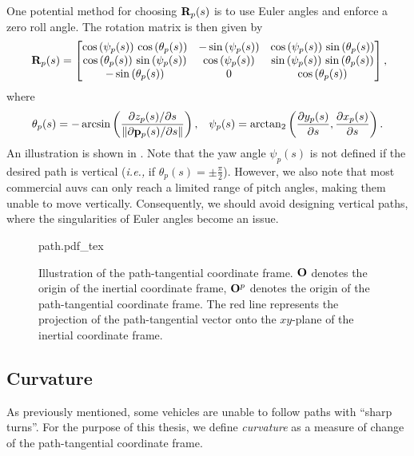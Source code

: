 One potential method for choosing $\mathbf{R}_p(s)$ is to use Euler angles and enforce a zero roll angle.
The rotation matrix is then given by
\begin{equation}
    \mat{R}_p(s) =
    \begin{bmatrix}
         \cos\left(\psi_{p}(s)\right)\,\cos\left(\theta_{p}(s)\right) & -\sin\left(\psi_{p}(s)\right) & \cos\left(\psi_{p}(s)\right)\,\sin\left(\theta_{p}(s)\right) \\ \cos\left(\theta_{p}(s)\right)\,\sin\left(\psi_{p}(s)\right) & \cos\left(\psi_{p}(s)\right) & \sin\left(\psi_{p}(s)\right)\,\sin\left(\theta_{p}(s)\right) \\ -\sin\left(\theta_{p}(s)\right) & 0 & \cos\left(\theta_{p}(s)\right)
    \end{bmatrix}\mathrlap{,}
    \label{eq:background_R_p_zero_roll}
\end{equation}
where
\begin{align}
    \theta_{p}(s) &= - \arcsin\left(\frac{\partial z_p(s) / \partial s}{\left\|\partial \mathbf{p}_p(s) / \partial s\right\|}\right), &
    \psi_{p}(s) = \mathrm{arctan}_{2}\left(\frac{\partial  y_{p}(s)}{\partial s}, \frac{\partial  x_{p}(s)}{\partial s}\right).
    \label{eq:background_path_tangential_3D}
\end{align}
An illustration is shown in .
Note that the yaw angle $\psi_{p}(s)$ is not defined if the desired path is vertical (\emph{i.e.,} if $\theta_p(s) = \pm \frac{\pi}{2}$).
However, we also note that most commercial \glspl{auv} can only reach a limited range of pitch angles, making them unable to move vertically.
Consequently, we should avoid designing vertical paths, where the singularities of Euler angles become an issue.

\begin{figure}[t]
    \centering
    \def\svgwidth{0.6\textwidth}
    {path.pdf_tex}
    \vspace*{-1em}
    \caption{Illustration of the path-tangential coordinate frame. $\mathbf{O}$ denotes the origin of the inertial coordinate frame, $\mathbf{O}^p$ denotes the origin of the path-tangential coordinate frame. The red line represents the projection of the path-tangential vector onto the $xy$-plane of the inertial coordinate frame.}
    \label{fig:background_path}
\end{figure}

\subsection{Curvature}
As previously mentioned, some vehicles are unable to follow paths with ``sharp turns''.
For the purpose of this thesis, we define \emph{curvature} as a measure of change of the path-tangential coordinate frame.

